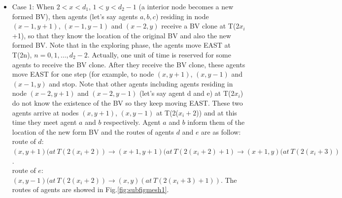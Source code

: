 \begin{itemize}
\item Case 1: When $2<x<d_1$, $1<y<d_2-1$ (a interior node becomes a new formed BV), then agents (let's say agents $a,b,c$) residing in node $(x-1, y+1)$, $(x-1, y-1)$ and $(x-2, y)$ receive a BV clone at T(2$x_i$+1), so that they know the location of the original BV and also the new formed BV. Note that in the exploring phase, the agents move EAST at T(2n), $n=0,1, \ldots ,d_2-2$. Actually, one unit of time is reserved for some agents to receive the BV clone. After they receive the BV clone, these agents move EAST for one step (for example, to node $(x, y+1)$, $(x, y-1)$ and $(x-1, y)$ and stop. Note that other agents including agents residing in node $(x-2, y+1)$ and $(x-2, y-1)$ (let's say agent d and e) at T(2$x_i$) do not know the existence of the BV so they keep moving EAST. These two agents arrive at nodes $(x, y+1)$, $(x, y-1)$ at T(2($x_i+2$)) and at this time they meet agent $a$ and $b$ respectively. Agent $a$ and $b$ inform them of the location of the new form BV and the routes of agents $d$ and $e$ are as follow:\\
route of $d$: $(x, y+1)(at\ T(2(x_i+2)){\rightarrow}(x+1,y+1)(at\ T(2(x_i+2)+1){\rightarrow}(x+1,y)(at\ T(2(x_i+3))$.\\
route of $e$: $(x, y-1)(at\ T(2(x_i+2)){\rightarrow}(x, y)(at\ T(2(x_i+3)+1))$.
The routes of agents are showed in Fig.\ref{fig:subfigmesh1}.



\end{itemize}
